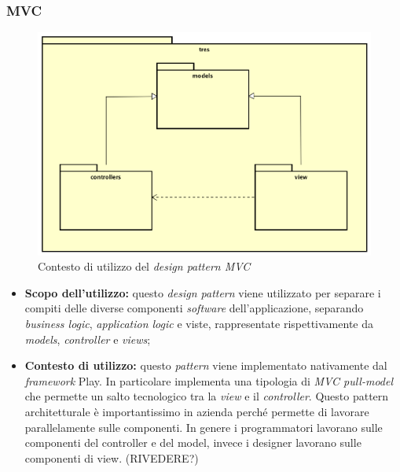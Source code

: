 \subsubsection{MVC}
\begin{figure}[h]
\centering
\includegraphics[scale=0.20]{immagini/mvc}
\caption{Contesto di utilizzo del \emph{design pattern MVC}}
\label{fig:pattern-mvc}
\end{figure}
\begin{itemize}
\item\textbf{Scopo dell'utilizzo:} questo \emph{design pattern} viene utilizzato per separare i compiti delle diverse componenti \emph{software} dell'applicazione, separando \emph{business logic}, \emph{application logic} e viste, rappresentate rispettivamente da \emph{models}, \emph{controller} e \emph{views};
\item \textbf{Contesto di utilizzo:} questo \emph{pattern} viene implementato nativamente dal \emph{framework} Play. In particolare implementa una tipologia di \emph{MVC pull-model} che permette un salto tecnologico tra la \emph{view} e il \emph{controller}. Questo pattern architetturale è importantissimo in azienda perché permette di lavorare parallelamente sulle componenti. In genere i programmatori lavorano sulle componenti del controller e del model, invece i designer lavorano sulle componenti di view. (RIVEDERE?)
\end{itemize}

